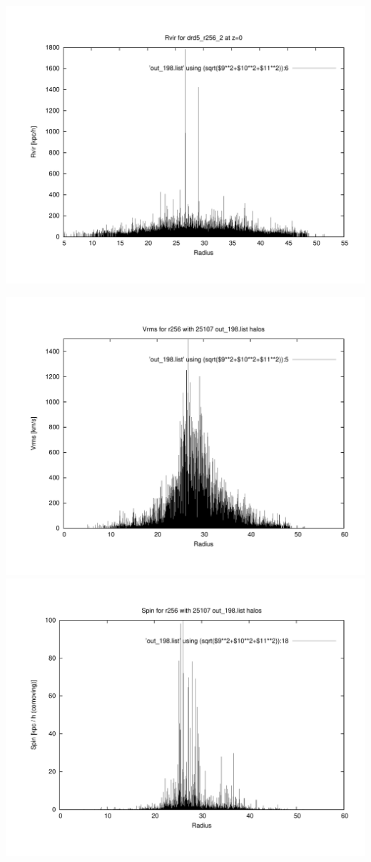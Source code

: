 \includegraphics[scale=0.3]{drd5_r256_2/plot_rvir_z0.pdf}

\includegraphics[scale=0.3]{drd5_r256_2/plot_Vrms_out_198.pdf}
\includegraphics[scale=0.3]{drd5_r256_2/plot_spin_out_198.pdf}

